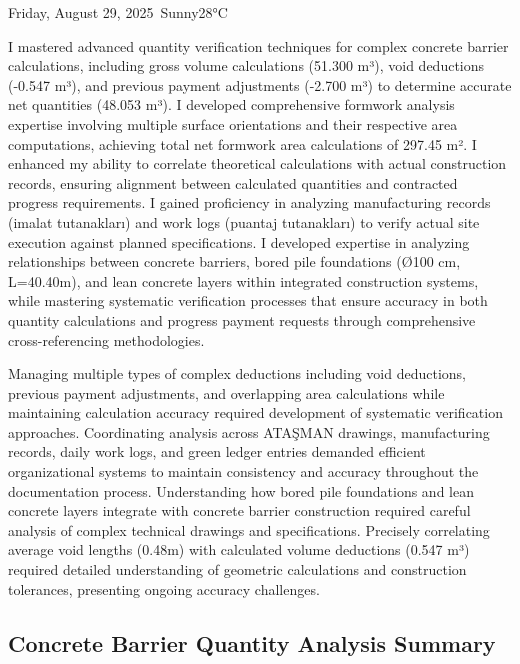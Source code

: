 \begin{dailyentry}{Friday, August 29, 2025}{\weathersunny\ Sunny}{28°C}
\begin{skillslearned}
\item[] I mastered advanced quantity verification techniques for complex concrete barrier calculations, including gross volume calculations (51.300 m³), void deductions (-0.547 m³), and previous payment adjustments (-2.700 m³) to determine accurate net quantities (48.053 m³). I developed comprehensive formwork analysis expertise involving multiple surface orientations and their respective area computations, achieving total net formwork area calculations of 297.45 m². I enhanced my ability to correlate theoretical calculations with actual construction records, ensuring alignment between calculated quantities and contracted progress requirements. I gained proficiency in analyzing manufacturing records (imalat tutanakları) and work logs (puantaj tutanakları) to verify actual site execution against planned specifications. I developed expertise in analyzing relationships between concrete barriers, bored pile foundations (Ø100 cm, L=40.40m), and lean concrete layers within integrated construction systems, while mastering systematic verification processes that ensure accuracy in both quantity calculations and progress payment requests through comprehensive cross-referencing methodologies.
\end{skillslearned}

\begin{challenges}
\item[] Managing multiple types of complex deductions including void deductions, previous payment adjustments, and overlapping area calculations while maintaining calculation accuracy required development of systematic verification approaches. Coordinating analysis across ATAŞMAN drawings, manufacturing records, daily work logs, and green ledger entries demanded efficient organizational systems to maintain consistency and accuracy throughout the documentation process. Understanding how bored pile foundations and lean concrete layers integrate with concrete barrier construction required careful analysis of complex technical drawings and specifications. Precisely correlating average void lengths (0.48m) with calculated volume deductions (0.547 m³) required detailed understanding of geometric calculations and construction tolerances, presenting ongoing accuracy challenges.
\end{challenges}

\vspace{1cm}

\subsection*{Concrete Barrier Quantity Analysis Summary}


\end{dailyentry}
